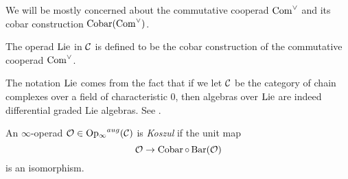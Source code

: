 We will be mostly concerned about the commutative cooperad $\operatorname{Com}^{\vee}$ and its cobar construction $\operatorname{Cobar}(\operatorname{Com}^{\vee})$. 
\begin{definition}
	The operad $\operatorname{Lie}$ in ${\mathcal{C}}$ is defined to be the cobar construction of the commutative cooperad $\operatorname{Com}^{\vee}$.
\end{definition}
The notation $\operatorname{Lie}$ comes from the fact that if we let ${\mathcal{C}}$ be the category of chain complexes over a field of characteristic $0$, then algebras over $\operatorname{Lie}$ are indeed differential graded Lie algebras. See \cite{ChingBar}.



	\begin{definition}
	An $\infty$-operad ${\mathcal{O}}\in \operatorname{Op_{\infty}}^{aug}({\mathcal{C}})$ is \emph{Koszul} if the unit map
	$$
	{\mathcal{O}}\rightarrow \operatorname{Cobar}\circ \operatorname{Bar}({\mathcal{O}})
	$$
	is an isomorphism.
\end{definition}

